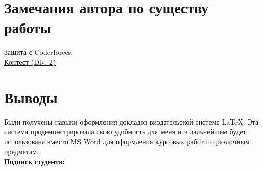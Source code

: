 \documentclass[12pt, letterpaper]{article}
\begin{document}
\section{Замечания автора по существу работы}
Защита с Coderforces:  
 \\
\href{https://codeforces.com/contest/1810/submission/199989384)}{Контест (Div. 2)} \\
\section{Выводы}
Были получены навыки оформления докладов виздательской системе \LaTeX{}. Эта система продемонстрировала свою удобность для меня и в дальнейшем будет использована вместо MS Word для оформления курсовых работ по различным предметам. \\
\flushright \textbf{Подпись студента:} \underline{\hspace{3cm}}
\end{document}
